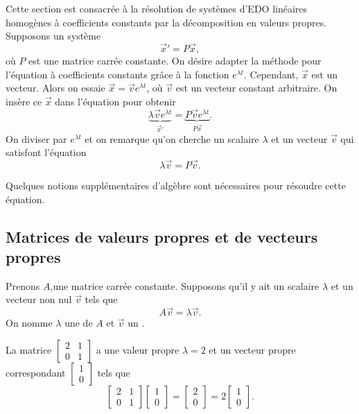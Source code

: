 Cette section est consacrée à la résolution de systèmes d’EDO linéaires homogènes à coefficients constants par la décomposition en valeurs propres. Supposons un système
\begin{equation*}
{\vec{x}}' = P\vec{x} ,
\end{equation*}
où
$P$ est une matrice carrée constante. On désire adapter la méthode pour l'équation à coefficients constants grâce à la fonction $e^{\lambda t}$.
Cependant, $\vec{x}$ est un vecteur. Alors on essaie $\vec{x} = \vec{v} e^{\lambda t}$, où
$\vec{v}$ est un vecteur constant arbitraire. On insère ce $\vec{x}$ dans l’équation pour obtenir
\begin{equation*}
\underbrace{\lambda \vec{v} e^{\lambda t}}_{{\vec{x}}'} =
\underbrace{P\vec{v} e^{\lambda t}}_{P\vec{x}} .
\end{equation*}
On diviser par $e^{\lambda t}$ et on remarque qu’on cherche un scalaire $\lambda$
et un vecteur $\vec{v}$ qui satisfont l’équation
\begin{equation*}
\lambda \vec{v} = P\vec{v} .
\end{equation*}

Quelques notions supplémentaires d’algèbre sont nécessaires pour résoudre cette équation.

\subsection{Matrices de valeurs propres et de vecteurs propres}

Prenons $A$,une matrice carrée constante. Supposons qu'il y ait un scalaire $\lambda$ et un vecteur non nul $\vec{v}$ tels que
\begin{equation*}
A \vec{v} = \lambda \vec{v}.
\end{equation*}
On nomme $\lambda$ une \emph{} de $A$ et $\vec{v}$
un \emph{}.

\begin{example}
La matrice $\left[ \begin{smallmatrix}
2 & 1 \\
0 & 1
\end{smallmatrix} \right]$ a une valeur propre $\lambda = 2$ et un vecteur propre correspondant $\left[ \begin{smallmatrix}
1 \\ 0
\end{smallmatrix} \right]$ tels que
\begin{equation*}
\begin{bmatrix}
2 & 1 \\
0 & 1
\end{bmatrix}
\begin{bmatrix}
1 \\ 0
\end{bmatrix}
=
\begin{bmatrix}
2 \\
0 
\end{bmatrix}
=
2
\begin{bmatrix}
1 \\ 0
\end{bmatrix} .
\end{equation*}
\end{example}


